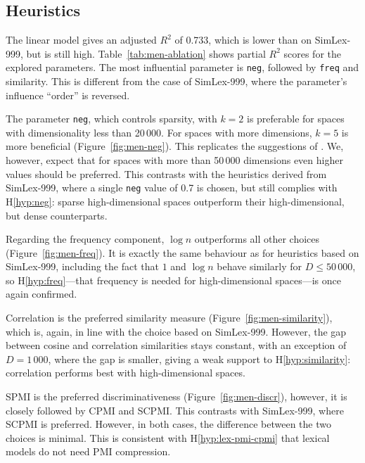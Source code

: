 \subsection{Heuristics}
\label{sec:heuristics-men}


The linear model gives an adjusted $R^2$ of 0.733, which is lower than on SimLex-999, but is still high. Table~\ref{tab:men-ablation} shows partial $R^2$ scores for the explored parameters. The most influential parameter is \texttt{neg}, followed by \texttt{freq} and similarity. This is different from the case of SimLex-999, where the parameter's influence ``order'' is reversed.


The parameter \texttt{neg}, which controls sparsity, with $k = 2$ is preferable for spaces with dimensionality less than 20\,000. For spaces with more dimensions,
$k = 5$ is more beneficial (Figure~\ref{fig:men-neg}). This replicates the suggestions of . We, however, expect that for spaces with more than 50\,000 dimensions even higher values should be preferred. This contrasts with the heuristics derived from SimLex-999, where a single \texttt{neg} value of 0.7 is chosen, but still complies with H\ref{hyp:neg}: sparse high-dimensional spaces outperform their high-dimensional, but dense counterparts.

Regarding the frequency component, $\log n$ outperforms all other choices (Figure~\ref{fig:men-freq}). It is exactly the same behaviour as for heuristics based on SimLex-999, including the fact that $1$ and $\log n$ behave similarly for $D \leq 50\,000$, so H\ref{hyp:freq}---that frequency is needed for high-dimensional spaces---is once again confirmed.




Correlation is the preferred similarity measure (Figure~\ref{fig:men-similarity}), which is, again, in line with the choice based on SimLex-999. However, the gap between cosine and correlation similarities stays constant, with an exception of $D = 1\,000$, where the gap is smaller, giving a weak support to H\ref{hyp:similarity}: correlation performs best with high-dimensional spaces.

SPMI is the preferred discriminativeness (Figure~\ref{fig:men-discr}), however, it is closely followed by CPMI and SCPMI. This contrasts with SimLex-999, where SCPMI is preferred. However, in both cases, the difference between the two choices is minimal. This is consistent with H\ref{hyp:lex-pmi-cpmi} that lexical models do not need PMI compression.

